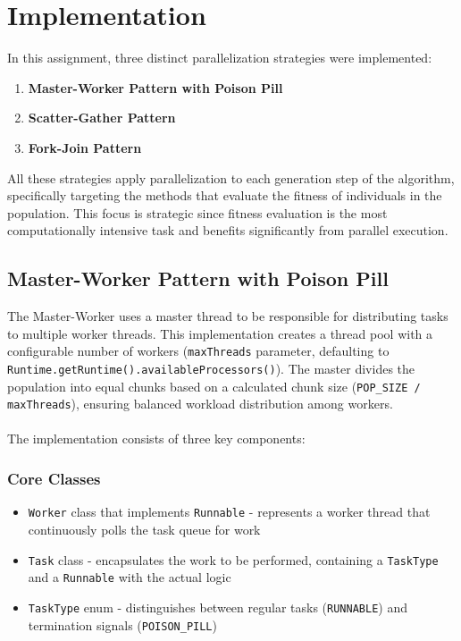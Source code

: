 \chapter{Implementation} \label{cap:implementation}


In this assignment, three distinct parallelization strategies were implemented:

\begin{enumerate}
    \item \textbf{Master-Worker Pattern with Poison Pill}
    \item \textbf{Scatter-Gather Pattern}
    \item \textbf{Fork-Join Pattern}
\end{enumerate}

All these strategies apply parallelization to each generation step of the
algorithm, specifically targeting the methods that evaluate the fitness of
individuals in the population. This focus is strategic since fitness evaluation
is the most computationally intensive task and benefits significantly from
parallel execution.

\section{Master-Worker Pattern with Poison Pill} \label{sec:master-worker}

The Master-Worker uses a master thread to be responsible for distributing tasks
to multiple worker threads. This implementation creates a thread pool with a
configurable number of workers (\texttt{maxThreads} parameter, defaulting to
\texttt{Runtime.getRuntime().availableProcessors()}). The master divides the
population into equal chunks based on a calculated chunk size (\texttt{POP\_SIZE
/ maxThreads}), ensuring balanced workload distribution among workers. \\
\\
The implementation consists of three key components:

\subsection{Core Classes}

\begin{itemize}
    \item \texttt{Worker} class that implements \texttt{Runnable} - represents a
    worker thread that continuously polls the task queue for work
    \item \texttt{Task} class - encapsulates the work to be performed,
    containing a \texttt{TaskType} and a \texttt{Runnable} with the actual logic
    \item \texttt{TaskType} enum - distinguishes between regular tasks
    (\texttt{RUNNABLE}) and termination signals (\texttt{POISON\_PILL})
\end{itemize}

